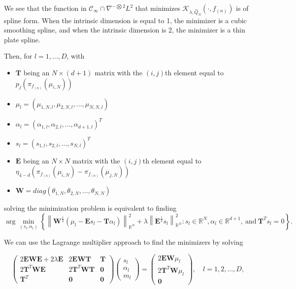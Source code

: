 We see that the function in $\mathcal{C}_{\infty} \cap \nabla^{-\bigotimes 2}L^2$ that minimizes $\mathcal{K}_{\lambda, \hat{Q}_N}(\cdot, f_{(n)})$ is of spline form. When the intrinsic dimension is equal to 1, the minimizer is a cubic smoothing spline, and when the intrinsic dimension is 2, the minimizer is a thin plate spline.

Then, for $l = 1, \dots, D$, with
\begin{itemize}
  \label{item:minimization_notation}

  \item $\mathbf{T}$ being an $N \times (d + 1)$ matrix with the $(i, j)$th element equal to $p_j(\pi_{f_{(n)}}(\mu_{i, N}))$
  \item $\mu_l = (\mu_{1, N, l}, \mu_{2, N, l}, \dots, \mu_{N, N, l})$
  \item $\alpha_l = (\alpha_{1, l}, \alpha_{2, l}, \dots, \alpha_{d+1, l})^{T}$
  \item $s_l = (s_{1, l}, s_{2, l}, \dots, s_{N, l})^{T}$
  \item $\mathbf{E}$ being an $N \times N$ matrix with the $(i, j)$th element equal to $\eta_{4-d}\left(\pi_{f_{(n)}}(\mu_{i, N}) - \pi_{f_{(n)}}(\mu_{j, N})\right)$
  \item $\mathbf{W} = diag(\theta_{1, N}, \theta_{2, N}, \dots, \theta_{N, N})$
\end{itemize}

solving the minimization problem is equivalent to finding
\[%
  \arg \min_{(s_l, \alpha_l)}\left\{\left\|\mathbf{W}^{\frac{1}{2}}\left(\mu_l - \mathbf{E}s_l - \mathbf{T}\alpha_l\right)\right\|_{\mathbb{R}^{N}}^2 + \lambda\left\|\mathbf{E}^{\frac{1}{2}}s_l\right\|_{\mathbb{R}^{N}}^2: s_l \in \mathbb{R}^{N}, \alpha_l \in \mathbb{R}^{d+1}, \ \text{and} \ \mathbf{T}^{T}s_l = 0\right\}
.\]%

We can use the Lagrange multiplier approach to find the minimizers by solving

\[%
  \left(
    \begin{array}{ccc}
      2\mathbf{EWE} + 2\lambda\mathbf{E} & 2\mathbf{EWT} & \mathbf{T} \\
      2\mathbf{T}^{T}\mathbf{WE} & 2\mathbf{T}^{T}\mathbf{WT} & \mathbf{0} \\
      \mathbf{T}^{T} & \mathbf{0} & \mathbf{0}
    \end{array}
  \right)\left(
    \begin{array}{c}
      s_l \\
      \alpha_l \\
      m_l
    \end{array}
  \right) = \left(
    \begin{array}{c}
      2\mathbf{EW}\mu_l \\
      2\mathbf{T}^{T}\mathbf{W}\mu_l \\
      \mathbf{0}
    \end{array}
  \right), \quad l = 1, 2, \dots, D
,\]%

